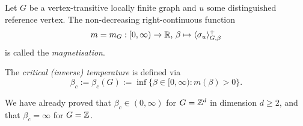 \begin{definition}
    Let $G$ be a vertex-transitive locally finite graph and $u$ some distinguished reference vertex.
    The non-decreasing right-continuous function
    \[
        m=m_G:[0,\infty)\to\mathbb R,\,\beta\mapsto\langle\sigma_u\rangle_{G,\beta}^+
    \]
    is called the \emph{magnetisation}.

    The \emph{critical (inverse) temperature} is defined via
    \[
        \beta_c:=\beta_c(G):=\inf\{\beta\in[0,\infty):m(\beta)>0\}.
    \]
\end{definition}

We have already proved that $\beta_c\in(0,\infty)$ for $G=\mathbb Z^d$
in dimension $d\geq 2$,
and that $\beta_c=\infty$ for $G=\mathbb Z$.
